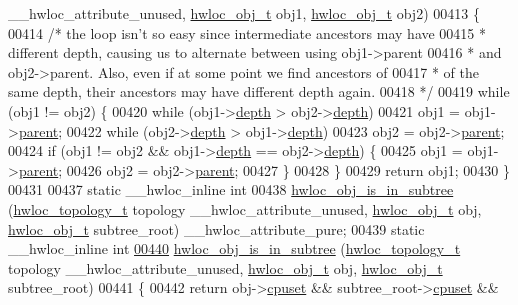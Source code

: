 \begin{DoxyCode}
      \_\_hwloc\_attribute\_unused, \hyperlink{a00238}{hwloc\_obj\_t} obj1, \hyperlink{a00238}{hwloc\_obj\_t} obj2)
00413 \{
00414   \textcolor{comment}{/* the loop isn't so easy since intermediate ancestors may have}
00415 \textcolor{comment}{   * different depth, causing us to alternate between using obj1->parent}
00416 \textcolor{comment}{   * and obj2->parent. Also, even if at some point we find ancestors of}
00417 \textcolor{comment}{   * of the same depth, their ancestors may have different depth again.}
00418 \textcolor{comment}{   */}
00419   \textcolor{keywordflow}{while} (obj1 != obj2) \{
00420     \textcolor{keywordflow}{while} (obj1->\hyperlink{a00238_a4876fd165b4fff35521f07ebd85355ed}{depth} > obj2->\hyperlink{a00238_a4876fd165b4fff35521f07ebd85355ed}{depth})
00421       obj1 = obj1->\hyperlink{a00238_adc494f6aed939992be1c55cca5822900}{parent};
00422     \textcolor{keywordflow}{while} (obj2->\hyperlink{a00238_a4876fd165b4fff35521f07ebd85355ed}{depth} > obj1->\hyperlink{a00238_a4876fd165b4fff35521f07ebd85355ed}{depth})
00423       obj2 = obj2->\hyperlink{a00238_adc494f6aed939992be1c55cca5822900}{parent};
00424     \textcolor{keywordflow}{if} (obj1 != obj2 && obj1->\hyperlink{a00238_a4876fd165b4fff35521f07ebd85355ed}{depth} == obj2->\hyperlink{a00238_a4876fd165b4fff35521f07ebd85355ed}{depth}) \{
00425       obj1 = obj1->\hyperlink{a00238_adc494f6aed939992be1c55cca5822900}{parent};
00426       obj2 = obj2->\hyperlink{a00238_adc494f6aed939992be1c55cca5822900}{parent};
00427     \}
00428   \}
00429   \textcolor{keywordflow}{return} obj1;
00430 \}
00431 
00437 \textcolor{keyword}{static} \_\_hwloc\_inline \textcolor{keywordtype}{int}
00438 \hyperlink{a00197_ga408cf74f5bf9ed497911a320c7f8cc56}{hwloc\_obj\_is\_in\_subtree} (\hyperlink{a00186_ga9d1e76ee15a7dee158b786c30b6a6e38}{hwloc\_topology\_t} topology 
      \_\_hwloc\_attribute\_unused, \hyperlink{a00238}{hwloc\_obj\_t} obj, \hyperlink{a00238}{hwloc\_obj\_t} subtree\_root) \_\_hwloc\_attribute\_pure;
00439 \textcolor{keyword}{static} \_\_hwloc\_inline \textcolor{keywordtype}{int}
\hyperlink{a00197_ga408cf74f5bf9ed497911a320c7f8cc56}{00440} \hyperlink{a00197_ga408cf74f5bf9ed497911a320c7f8cc56}{hwloc\_obj\_is\_in\_subtree} (\hyperlink{a00186_ga9d1e76ee15a7dee158b786c30b6a6e38}{hwloc\_topology\_t} topology 
      \_\_hwloc\_attribute\_unused, \hyperlink{a00238}{hwloc\_obj\_t} obj, \hyperlink{a00238}{hwloc\_obj\_t} subtree\_root)
00441 \{
00442   \textcolor{keywordflow}{return} obj->\hyperlink{a00238_a67925e0f2c47f50408fbdb9bddd0790f}{cpuset} && subtree\_root->\hyperlink{a00238_a67925e0f2c47f50408fbdb9bddd0790f}{cpuset} && 

\end{DoxyCode}
